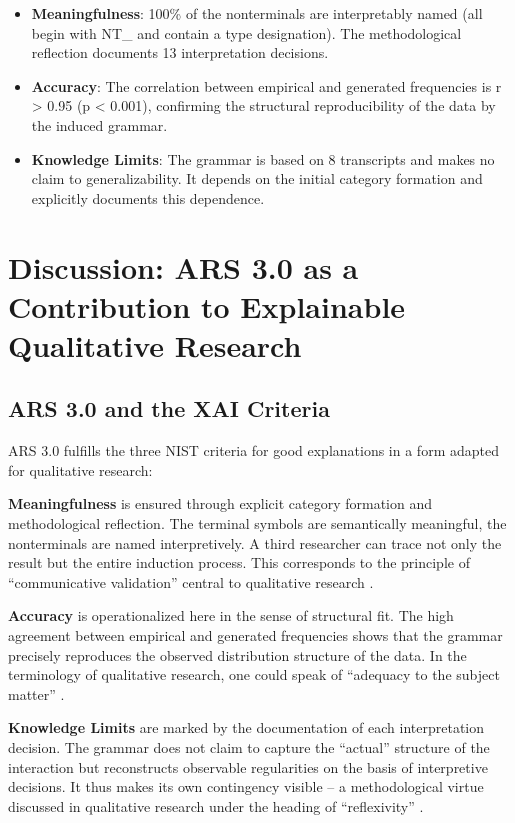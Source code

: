 \documentclass[
  12pt,
  a4paper,
  oneside,
  titlepage
]{article}
\begin{document}
\begin{itemize}
    \item \textbf{Meaningfulness}: 100\% of the nonterminals are 
    interpretably named (all begin with NT\_ and contain a type 
    designation). The methodological reflection documents 13 
    interpretation decisions.
    
    \item \textbf{Accuracy}: The correlation between empirical and 
    generated frequencies is r > 0.95 (p < 0.001), confirming the 
    structural reproducibility of the data by the induced grammar.
    
    \item \textbf{Knowledge Limits}: The grammar is based on 8 transcripts 
    and makes no claim to generalizability. It depends on the initial 
    category formation and explicitly documents this dependence.
\end{itemize}

\section{Discussion: ARS 3.0 as a Contribution to Explainable Qualitative Research}

\subsection{ARS 3.0 and the XAI Criteria}

ARS 3.0 fulfills the three NIST criteria for good explanations in a 
form adapted for qualitative research:

\textbf{Meaningfulness} is ensured through explicit category formation 
and methodological reflection. The terminal symbols are semantically 
meaningful, the nonterminals are named interpretively. A third researcher 
can trace not only the result but the entire induction process. This 
corresponds to the principle of \enquote{communicative validation} 
central to qualitative research \citep[ p.~328]{Flick2019}.

\textbf{Accuracy} is operationalized here in the sense of structural 
fit. The high agreement between empirical and generated frequencies 
shows that the grammar precisely reproduces the observed distribution 
structure of the data. In the terminology of qualitative research, one 
could speak of \enquote{adequacy to the subject matter} 
\citep[ p.~34]{Przyborski2021}.

\textbf{Knowledge Limits} are marked by the documentation of each 
interpretation decision. The grammar does not claim to capture the 
\enquote{actual} structure of the interaction but reconstructs observable 
regularities on the basis of interpretive decisions. It thus makes its 
own contingency visible – a methodological virtue discussed in 
qualitative research under the heading of \enquote{reflexivity} 
\citep[ p.~129]{Flick2019}.
\end{document}
